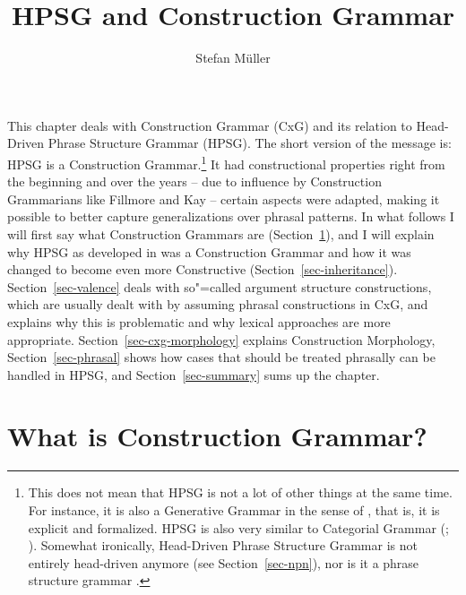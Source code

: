 \documentclass[output=paper,biblatex,babelshorthands,newtxmath,draftmode,colorlinks,citecolor=brown]{langscibook}
\author{Stefan Müller\affiliation{Humboldt-Universität zu Berlin}}
\title{HPSG and Construction Grammar}
\begin{document}
\maketitle
\label{firstpage-cxg}\label{chap-cxg}
\indexcxgstart



\noindent
This chapter deals with Construction Grammar (CxG) and its relation to Head-Driven Phrase Structure
Grammar (HPSG). The short version of the message is: HPSG is a Construction Grammar.\footnote{%
  This does not mean that HPSG is not a lot of other things at the same time. For instance, it is
  also a Generative Grammar in the sense of \citet[]{Chomsky65a}, that is, it is explicit and
  formalized. HPSG is also very similar to Categorial Grammar (\citealt{MuellerUnifying};
  ). Somewhat ironically, Head-Driven Phrase Structure Grammar is not entirely
  head-driven anymore (see Section~\ref{sec-npn}), nor is it a phrase structure grammar .
}
It had constructional properties right from the beginning\label{page-HPSG-always-was-constructional} and over the years -- due to influence by
Construction Grammarians like Fillmore and Kay -- certain aspects were adapted, making it possible to better
capture generalizations over phrasal patterns. In what follows I will first say what Construction
Grammars are (Section~\ref{sec-cxg}), and I will explain why HPSG as developed in  was a
Construction Grammar and how it was changed to become even more Constructive
(Section~\ref{sec-inheritance}). Section~\ref{sec-valence} deals with so"=called argument structure
constructions, which are usually dealt with by assuming phrasal constructions in CxG, and explains
why this is problematic and why lexical approaches are more appropriate. Section~\ref{sec-cxg-morphology} explains
Construction Morphology, Section~\ref{sec-phrasal} shows how cases that should be treated phrasally
can be handled in HPSG, and Section~\ref{sec-summary} sums up the chapter.

\section{What is Construction Grammar?}
\label{sec-cxg}
\end{document}
